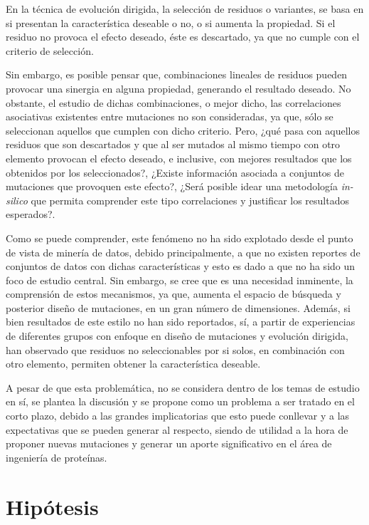 En la técnica de evolución dirigida, la selección de residuos o variantes, se basa en si presentan la característica deseable o no, o si aumenta la propiedad. Si el residuo no provoca el efecto deseado, éste es descartado, ya que no cumple con el criterio de selección.

Sin embargo, es posible pensar que, combinaciones lineales de residuos pueden provocar una sinergia en alguna propiedad, generando el resultado deseado. No obstante, el estudio de dichas combinaciones, o mejor dicho, las correlaciones asociativas existentes entre mutaciones no son consideradas, ya que, sólo se seleccionan aquellos que cumplen con dicho criterio. Pero, ¿qué pasa con aquellos residuos que son descartados y que al ser mutados al mismo tiempo con otro elemento provocan el efecto deseado, e inclusive, con mejores resultados que los obtenidos por los seleccionados?, ¿Existe información asociada a conjuntos de mutaciones que provoquen este efecto?, ¿Será posible idear una metodología \textit{in-silico} que permita comprender este tipo correlaciones y justificar los resultados esperados?.

Como se puede comprender, este fenómeno no ha sido explotado desde el punto de vista de minería de datos, debido principalmente, a que no existen reportes de conjuntos de datos con dichas características y esto es dado a que no ha sido un foco de estudio central. Sin embargo, se cree que es una necesidad inminente, la comprensión de estos mecanismos, ya que, aumenta el espacio de búsqueda y posterior diseño de mutaciones, en un gran número de dimensiones. Además, si bien resultados de este estilo no han sido reportados, sí, a partir de experiencias de diferentes grupos con enfoque en diseño de mutaciones y evolución dirigida, han observado que residuos no seleccionables por si solos, en combinación con otro elemento, permiten obtener la característica deseable.

A pesar de que esta problemática, no se considera dentro de los temas de estudio en sí, se plantea la discusión y se propone como un problema a ser tratado en el corto plazo, debido a las grandes implicatorias que esto puede conllevar y a las expectativas que se pueden generar al respecto, siendo de utilidad a la hora de proponer nuevas mutaciones y generar un aporte significativo en el área de ingeniería de proteínas.
 
\section{Hipótesis}

